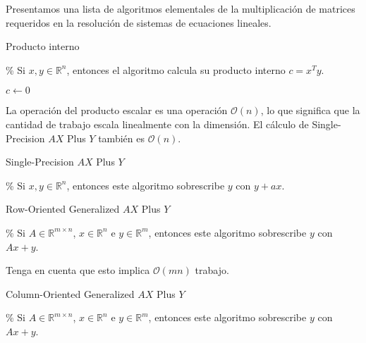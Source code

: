 Presentamos una lista de algoritmos elementales de la multiplicación
de matrices requeridos en la resolución de sistemas de ecuaciones
lineales.

\begin{algorithm}[H]
    \caption{Producto interno}
    \% Si $x,y\in\mathbb{R}^{n}$, entonces el algoritmo calcula su
    producto interno $c=x^{T}y$.

    $c\longleftarrow 0$\;
\end{algorithm}

La operación del producto escalar es una operación
$\mathcal{O}\left(n\right)$, lo que significa que la cantidad de
trabajo escala linealmente con la dimensión.
El cálculo de Single-Precision $AX$ Plus $Y$ también es
$\mathcal{O}\left(n\right)$.

\begin{algorithm}[H]
    \caption{Single-Precision $AX$ Plus $Y$}
    \% Si $x,y\in\mathbb{R}^{n}$, entonces este algoritmo sobrescribe
    $y$ con $y+ax$.

\end{algorithm}

\begin{algorithm}[H]
    \caption{Row-Oriented Generalized $AX$ Plus $Y$}
    \% Si $A\in\mathbb{R}^{m\times n}$, $x\in\mathbb{R}^{n}$ e
    $y\in\mathbb{R}^{m}$, entonces este algoritmo sobrescribe $y$ con
    $Ax+y$.

\end{algorithm}

Tenga en cuenta que esto implica $\mathcal{O}\left(mn\right)$
trabajo.

\begin{algorithm}[H]
    \caption{Column-Oriented Generalized $AX$ Plus $Y$}
    \% Si $A\in\mathbb{R}^{m\times n}$, $x\in\mathbb{R}^{n}$ e
    $y\in\mathbb{R}^{m}$, entonces este algoritmo sobrescribe $y$ con
    $Ax+y$.

\end{algorithm}

